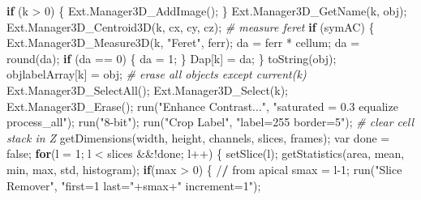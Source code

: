 \documentclass[10pt, b5paper, singlespacinge, twoside]{reedthesis} %
\newenvironment{Shaded}{}{}
\newcommand{\AttributeTok}[1]{#1}
\newcommand{\CommentTok}[1]{\textit{#1}}
\newcommand{\ControlFlowTok}[1]{\textbf{#1}}
\newcommand{\DecValTok}[1]{#1}
\newcommand{\ErrorTok}[1]{\textbf{#1}}
\newcommand{\FunctionTok}[1]{#1}
\newcommand{\NormalTok}[1]{#1}
\newcommand{\OtherTok}[1]{#1}
\newcommand{\SpecialCharTok}[1]{#1}
\newcommand{\StringTok}[1]{#1}
\theoremstyle{definition}
\theoremstyle{definition}
\theoremstyle{definition}
\theoremstyle{remark}
\begin{document}
\begin{Shaded}
\begin{Highlighting}[numbers=left,,]
            \ControlFlowTok{if}\NormalTok{ (k }\SpecialCharTok{\textgreater{}} \DecValTok{0}\NormalTok{) \{}
              \FunctionTok{Ext.Manager3D\_AddImage}\NormalTok{();}
\NormalTok{            \}}
        \FunctionTok{Ext.Manager3D\_GetName}\NormalTok{(k, obj);}
        \FunctionTok{Ext.Manager3D\_Centroid3D}\NormalTok{(k, cx, cy, cz);}
    \CommentTok{\# measure feret}
        \ControlFlowTok{if}\NormalTok{ (symAC) \{}
          \FunctionTok{Ext.Manager3D\_Measure3D}\NormalTok{(k, }\StringTok{"Feret"}\NormalTok{, ferr); }
\NormalTok{            da }\OtherTok{=}\NormalTok{ ferr }\SpecialCharTok{*}\NormalTok{ cellum;}
\NormalTok{            da }\OtherTok{=} \FunctionTok{round}\NormalTok{(da);}
          \ControlFlowTok{if}\NormalTok{ (da }\SpecialCharTok{==} \DecValTok{0}\NormalTok{) \{}
\NormalTok{              da }\OtherTok{=} \DecValTok{1}\NormalTok{;}
\NormalTok{          \}}
\NormalTok{        Dap[k] }\OtherTok{=}\NormalTok{ da;}
\NormalTok{        \}}
        \FunctionTok{toString}\NormalTok{(obj);}
\NormalTok{        objlabelArray[k] }\OtherTok{=}\NormalTok{ obj;}
    \CommentTok{\# erase all objects except current(k)}
        \FunctionTok{Ext.Manager3D\_SelectAll}\NormalTok{();}
        \FunctionTok{Ext.Manager3D\_Select}\NormalTok{(k);}
        \FunctionTok{Ext.Manager3D\_Erase}\NormalTok{();}
        \FunctionTok{run}\NormalTok{(}\StringTok{"Enhance Contrast..."}\NormalTok{, }\StringTok{"saturated = 0.3 equalize process\_all"}\NormalTok{);}
        \FunctionTok{run}\NormalTok{(}\StringTok{"8{-}bit"}\NormalTok{);}
        \FunctionTok{run}\NormalTok{(}\StringTok{"Crop Label"}\NormalTok{, }\StringTok{"label=255 border=5"}\NormalTok{);}
    \CommentTok{\# clear cell stack in Z}
        \FunctionTok{getDimensions}\NormalTok{(width, height, channels, slices, frames);}
\NormalTok{        var done }\OtherTok{=}\NormalTok{ false; }
        \ControlFlowTok{for}\NormalTok{(}\AttributeTok{l =} \DecValTok{1}\NormalTok{; l }\SpecialCharTok{\textless{}}\NormalTok{ slices }\SpecialCharTok{\&\&!}\NormalTok{done; l}\SpecialCharTok{++}\NormalTok{) \{}
          \FunctionTok{setSlice}\NormalTok{(l);}
            \FunctionTok{getStatistics}\NormalTok{(area, mean, min, max, std, histogram);}
            \ControlFlowTok{if}\NormalTok{(max }\SpecialCharTok{\textgreater{}} \DecValTok{0}\NormalTok{) \{ }\SpecialCharTok{/}\ErrorTok{/}\NormalTok{ from apical}
\NormalTok{            smax }\OtherTok{=}\NormalTok{ l}\DecValTok{{-}1}\NormalTok{;}
            \FunctionTok{run}\NormalTok{(}\StringTok{"Slice Remover"}\NormalTok{, }\StringTok{"first=1 last="}\SpecialCharTok{+}\NormalTok{smax}\SpecialCharTok{+}\StringTok{" increment=1"}\NormalTok{);}

\end{Highlighting}
\end{Shaded}
\end{document}
